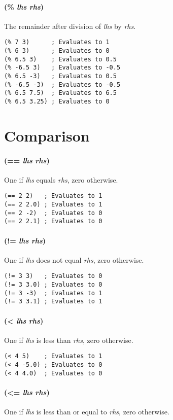 \documentclass[numbers=noenddot]{scrbook}
\begin{document}
\paragraph{(\% \emph{lhs} \emph{rhs})}
The remainder after division of \emph{lhs} by \emph{rhs}.

\begin{verbatim}
(% 7 3)      ; Evaluates to 1
(% 6 3)      ; Evaluates to 0
(% 6.5 3)    ; Evaluates to 0.5
(% -6.5 3)   ; Evaluates to -0.5
(% 6.5 -3)   ; Evaluates to 0.5
(% -6.5 -3)  ; Evaluates to -0.5
(% 6.5 7.5)  ; Evaluates to 6.5
(% 6.5 3.25) ; Evaluates to 0
\end{verbatim}

\section{Comparison}
\paragraph{(== \emph{lhs} \emph{rhs})}
One if \emph{lhs} equals \emph{rhs}, zero otherwise.

\begin{verbatim}
(== 2 2)   ; Evaluates to 1
(== 2 2.0) ; Evaluates to 1
(== 2 -2)  ; Evaluates to 0
(== 2 2.1) ; Evaluates to 0
\end{verbatim}

\paragraph{(!= \emph{lhs} \emph{rhs})}
One if \emph{lhs} does not equal \emph{rhs}, zero otherwise.

\begin{verbatim}
(!= 3 3)   ; Evaluates to 0
(!= 3 3.0) ; Evaluates to 0
(!= 3 -3)  ; Evaluates to 1
(!= 3 3.1) ; Evaluates to 1
\end{verbatim}

\paragraph{(< \emph{lhs} \emph{rhs})}
One if \emph{lhs} is less than \emph{rhs}, zero otherwise.

\begin{verbatim}
(< 4 5)    ; Evaluates to 1
(< 4 -5.0) ; Evaluates to 0
(< 4 4.0)  ; Evaluates to 0
\end{verbatim}

\paragraph{(<= \emph{lhs} \emph{rhs})}
One if \emph{lhs} is less than or equal to \emph{rhs}, zero otherwise.
\end{document}
